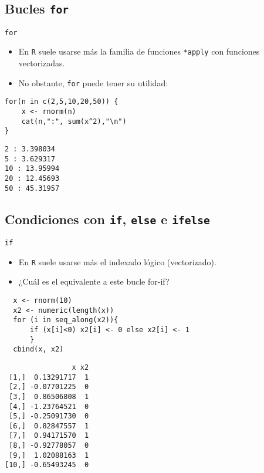 \documentclass[xcolor={usenames,svgnames,dvipsnames}]{beamer}
\begin{document}
\subsection{Bucles \texttt{for}}
\label{sec:org2e39e87}
\begin{frame}[fragile,label={sec:orge0772fa}]{\texttt{for}}
 \begin{itemize}
\item En \texttt{R} suele usarse más la familia de funciones \texttt{*apply} con funciones vectorizadas.
\item No obstante, \texttt{for} puede tener su utilidad:
\end{itemize}
\lstset{language=r,label= ,caption= ,captionpos=b,numbers=none}
\begin{lstlisting}
for(n in c(2,5,10,20,50)) {
    x <- rnorm(n)
    cat(n,":", sum(x^2),"\n")
}
\end{lstlisting}

\begin{verbatim}
2 : 3.398034 
5 : 3.629317 
10 : 13.95994 
20 : 12.45693 
50 : 45.31957
\end{verbatim}
\end{frame}

\subsection{Condiciones con \texttt{if}, \texttt{else} e \texttt{ifelse}}
\label{sec:org9360bef}
\begin{frame}[fragile,label={sec:org43ce27f}]{\texttt{if}}
 \begin{itemize}
\item En \texttt{R} suele usarse más el indexado lógico (vectorizado).
\item ¿Cuál es el equivalente a este bucle for-if?
\end{itemize}
\lstset{language=r,label= ,caption= ,captionpos=b,numbers=none}
\begin{lstlisting}
  x <- rnorm(10)
  x2 <- numeric(length(x))
  for (i in seq_along(x2)){
      if (x[i]<0) x2[i] <- 0 else x2[i] <- 1
      }
  cbind(x, x2)
\end{lstlisting}

\begin{verbatim}
                x x2
 [1,]  0.13291717  1
 [2,] -0.07701225  0
 [3,]  0.86506808  1
 [4,] -1.23764521  0
 [5,] -0.25091730  0
 [6,]  0.82847557  1
 [7,]  0.94171570  1
 [8,] -0.92778057  0
 [9,]  1.02088163  1
[10,] -0.65493245  0
\end{verbatim}
\end{frame}
\end{document}
